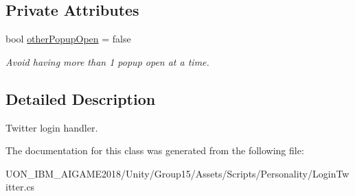 \subsection*{Private Attributes}
\begin{DoxyCompactItemize}
\item 
\mbox{\label{class_login_twitter_af567aa064be62c7c71fdd375d5f46b10}} 
bool \mbox{\hyperlink{class_login_twitter_af567aa064be62c7c71fdd375d5f46b10}{other\+Popup\+Open}} = false
\begin{DoxyCompactList}\small\item\em Avoid having more than 1 popup open at a time. \end{DoxyCompactList}\end{DoxyCompactItemize}


\subsection{Detailed Description}
Twitter login handler. 

The documentation for this class was generated from the following file\+:\begin{DoxyCompactItemize}
\item 
U\+O\+N\+\_\+\+I\+B\+M\+\_\+\+A\+I\+G\+A\+M\+E2018/\+Unity/\+Group15/\+Assets/\+Scripts/\+Personality/Login\+Twitter.\+cs\end{DoxyCompactItemize}
